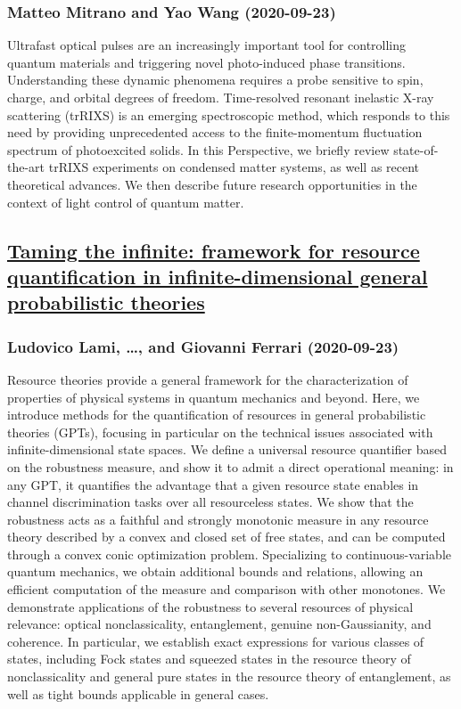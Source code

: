 \subsubsection*{Matteo Mitrano and Yao Wang (2020-09-23)}
Ultrafast optical pulses are an increasingly important tool for controlling
quantum materials and triggering novel photo-induced phase transitions.
Understanding these dynamic phenomena requires a probe sensitive to spin,
charge, and orbital degrees of freedom. Time-resolved resonant inelastic X-ray
scattering (trRIXS) is an emerging spectroscopic method, which responds to this
need by providing unprecedented access to the finite-momentum fluctuation
spectrum of photoexcited solids. In this Perspective, we briefly review
state-of-the-art trRIXS experiments on condensed matter systems, as well as
recent theoretical advances. We then describe future research opportunities in
the context of light control of quantum matter.

\subsection*{\href{http://arxiv.org/abs/2009.11313v1}{Taming the infinite: framework for resource quantification in  infinite-dimensional general probabilistic theories}}
\subsubsection*{Ludovico Lami, \dots, and Giovanni Ferrari (2020-09-23)}
Resource theories provide a general framework for the characterization of
properties of physical systems in quantum mechanics and beyond. Here, we
introduce methods for the quantification of resources in general probabilistic
theories (GPTs), focusing in particular on the technical issues associated with
infinite-dimensional state spaces. We define a universal resource quantifier
based on the robustness measure, and show it to admit a direct operational
meaning: in any GPT, it quantifies the advantage that a given resource state
enables in channel discrimination tasks over all resourceless states. We show
that the robustness acts as a faithful and strongly monotonic measure in any
resource theory described by a convex and closed set of free states, and can be
computed through a convex conic optimization problem.
  Specializing to continuous-variable quantum mechanics, we obtain additional
bounds and relations, allowing an efficient computation of the measure and
comparison with other monotones. We demonstrate applications of the robustness
to several resources of physical relevance: optical nonclassicality,
entanglement, genuine non-Gaussianity, and coherence. In particular, we
establish exact expressions for various classes of states, including Fock
states and squeezed states in the resource theory of nonclassicality and
general pure states in the resource theory of entanglement, as well as tight
bounds applicable in general cases.

